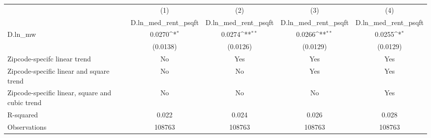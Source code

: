 {
\def\sym#1{\ifmmode^{#1}\else\(^{#1}\)\fi}
\begin{tabular}{l*{4}{c}}
\hline\hline
          &\multicolumn{1}{c}{(1)}&\multicolumn{1}{c}{(2)}&\multicolumn{1}{c}{(3)}&\multicolumn{1}{c}{(4)}\\
          &\multicolumn{1}{c}{D.ln\_med\_rent\_psqft}&\multicolumn{1}{c}{D.ln\_med\_rent\_psqft}&\multicolumn{1}{c}{D.ln\_med\_rent\_psqft}&\multicolumn{1}{c}{D.ln\_med\_rent\_psqft}\\
\hline
D.ln\_mw   &   0.0270\sym{*}  &   0.0274\sym{**} &   0.0266\sym{**} &   0.0255\sym{*}  \\
          & (0.0138)         & (0.0126)         & (0.0129)         & (0.0129)         \\
\hline
Zipcode-specifc linear trend&       No         &      Yes         &      Yes         &      Yes         \\
Zipcode-specific linear and square trend&       No         &       No         &      Yes         &      Yes         \\
Zipcode-specific linear, square and cubic trend&       No         &       No         &       No         &      Yes         \\
R-squared &    0.022         &    0.024         &    0.026         &    0.028         \\
Observations&   108763         &   108763         &   108763         &   108763         \\
\hline\hline
\end{tabular}
}
